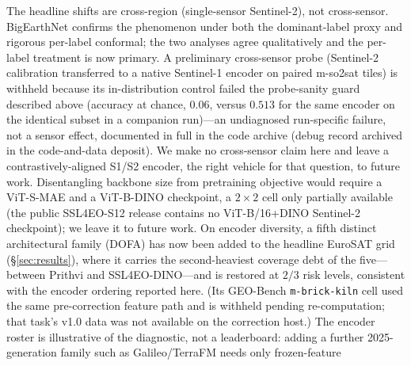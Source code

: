 \documentclass[11pt]{article}
\begin{document}
The headline shifts are cross-region (single-sensor Sentinel-2), not
cross-sensor. BigEarthNet confirms the phenomenon under both the dominant-label proxy and rigorous
per-label conformal; the two analyses agree qualitatively and the per-label treatment is now primary.
A preliminary cross-sensor probe (Sentinel-2 calibration transferred to a native Sentinel-1 encoder on
paired m-so2sat tiles) is withheld because its in-distribution control failed the probe-sanity guard
described above (accuracy at chance, $0.06$,
versus $0.513$ for the same encoder on the identical subset in a companion run)---an undiagnosed
run-specific failure, not a sensor effect, documented in full in the code archive
(debug record archived in the code-and-data deposit). We make no cross-sensor claim here and leave
a contrastively-aligned S1/S2 encoder, the right vehicle for that question, to future work. Disentangling
backbone size from pretraining objective would
require a ViT-S-MAE and a ViT-B-DINO checkpoint, a $2\times2$ cell only partially available (the public
SSL4EO-S12 release contains no ViT-B/16+DINO Sentinel-2 checkpoint); we leave it to future work. On encoder
diversity, a fifth distinct architectural family (DOFA) has now been added to the headline EuroSAT grid
(\S\ref{sec:results}), where it carries the second-heaviest coverage debt of the five---between Prithvi and
SSL4EO-DINO---and is restored at $2/3$ risk levels, consistent with the encoder ordering reported here. (Its
GEO-Bench \texttt{m-brick-kiln} cell used the same pre-correction feature path and is withheld pending
re-computation; that task's v1.0 data was not available on the correction host.) The encoder roster is illustrative of the diagnostic, not a
leaderboard: adding a further 2025-generation family such as Galileo/TerraFM needs only frozen-feature
\end{document}
